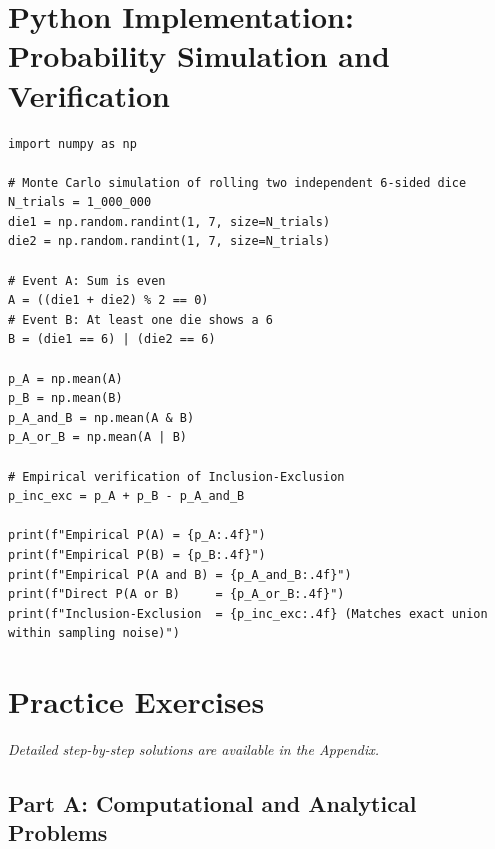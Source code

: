 \section{Python Implementation: Probability Simulation and Verification}

\begin{lstlisting}[caption={Verifying Kolmogorov Axioms and Inclusion-Exclusion in Python}]
import numpy as np

# Monte Carlo simulation of rolling two independent 6-sided dice
N_trials = 1_000_000
die1 = np.random.randint(1, 7, size=N_trials)
die2 = np.random.randint(1, 7, size=N_trials)

# Event A: Sum is even
A = ((die1 + die2) % 2 == 0)
# Event B: At least one die shows a 6
B = (die1 == 6) | (die2 == 6)

p_A = np.mean(A)
p_B = np.mean(B)
p_A_and_B = np.mean(A & B)
p_A_or_B = np.mean(A | B)

# Empirical verification of Inclusion-Exclusion
p_inc_exc = p_A + p_B - p_A_and_B

print(f"Empirical P(A) = {p_A:.4f}")
print(f"Empirical P(B) = {p_B:.4f}")
print(f"Empirical P(A and B) = {p_A_and_B:.4f}")
print(f"Direct P(A or B)     = {p_A_or_B:.4f}")
print(f"Inclusion-Exclusion  = {p_inc_exc:.4f} (Matches exact union within sampling noise)")
\end{lstlisting}

\newpage
\section{Practice Exercises}
\textit{Detailed step-by-step solutions are available in the Appendix.}

\subsection*{Part A: Computational and Analytical Problems}

